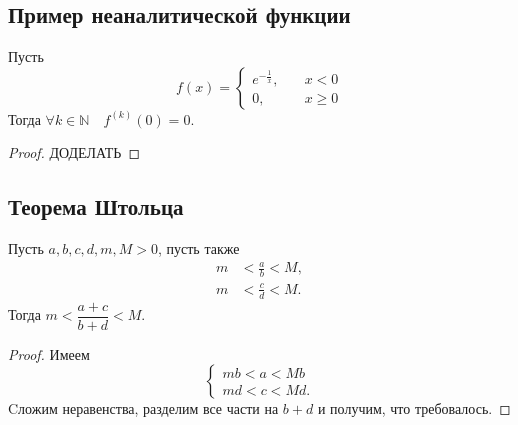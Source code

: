 \subsection{Пример неаналитической функции}

\begin{example} \hypertarget{t5}{}
	Пусть \[
		f(x) = \begin{cases} e^{-\frac1x}, \quad &x < 0 \\ 0, \quad &x \geqslant 0 \end{cases}
	\]
	Тогда $\forall k \in \mathbb{N} \quad f^{(k)}(0) = 0$.
\end{example}
\begin{proof}
	ДОДЕЛАТЬ
\end{proof}

\subsection{Теорема Штольца}

\begin{lemma} \hypertarget{t6_1}{}
	Пусть $a, b, c, d, m, M > 0$, пусть также
	\begin{align*}
		m &< \frac{a}{b} < M, \\
		m &< \frac{c}{d} < M.
	\end{align*}
	Тогда $m < \dfrac{a + c}{b + d} < M$.
\end{lemma}
\begin{proof}
	Имеем \[
	\begin{cases}
		mb < a < Mb \\
		md < c < Md.	
	\end{cases}
	\]
	Cложим неравенства, разделим все части на $b + d$ и получим, что требовалось.
\end{proof}

